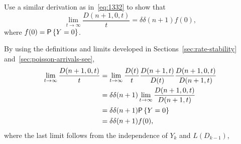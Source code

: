 \begin{exercise}
Use a similar derivation as in~\eqref{eq:1332} to   show that 
\begin{equation*}
  \lim_{t\to\infty} \frac{  D(n+1, 0, t)}t  = \delta \delta(n+1) f(0),
\end{equation*}
where $f(0)=\P{Y=0}$.
\begin{solution}
By using the definitions and limits developed in
Sections~\ref{sec:rate-stability} and~\ref{sec:poisson-arrivals-see},
\begin{equation*}
  \begin{split}
  \lim_{t\to\infty} \frac{  D(n+1, 0, t)}t 
&=   \lim_{t\to\infty}  \frac{D(t)}t \frac{D(n+1, t)}{D(t)}\frac{ D(n+1, 0, t)}{D(n+1,t)} \\
&=   \delta \delta(n+1) \lim_{t\to\infty} \frac{ D(n+1, 0, t)}{D(n+1,t)} \\
&=   \delta \delta(n+1) \P{Y=0}\\
& = \delta \delta(n+1) f(0),
  \end{split}
\end{equation*}
where the last limit follows from the independence of $Y_k$ and
$L(D_{k-1})$, 
\end{solution}
\end{exercise}

